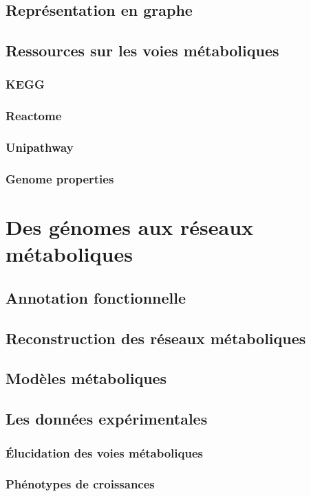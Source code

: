 \begin{refsection}
    \subsection{Représentation en graphe}
    \subsection{Ressources sur les voies métaboliques}
    \subsubsection{KEGG}
    \subsubsection{Reactome}
    \subsubsection{Unipathway}
    \subsubsection{Genome properties}
    
    \section{Des génomes aux réseaux métaboliques}
    \subsection{Annotation fonctionnelle}
    \subsection{Reconstruction des réseaux métaboliques}
    \subsection{Modèles métaboliques}
    \subsection{Les données expérimentales}
    \subsubsection{Élucidation des voies métaboliques}
    \subsubsection{Phénotypes de croissances}
    

\end{refsection}
